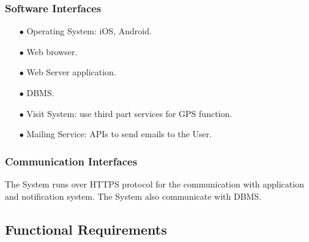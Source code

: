 \documentclass[a4paper, 12pt, oneside]{article}
\begin{document}
\subsubsection{Software Interfaces}
\begin{enumerate}
\item[$\bullet$] Operating System: iOS, Android.
\item[$\bullet$] Web browser.
\item[$\bullet$] Web Server application.
\item[$\bullet$] DBMS.
\item[$\bullet$] Visit System: use third part services for GPS function. 
\item[$\bullet$] Mailing Service: APIs to send emails to the User.
\end{enumerate}

\subsubsection{Communication Interfaces}
The System runs over HTTPS protocol for the communication with application and notification system. The System also communicate with DBMS.

\subsection{Functional Requirements}
\end{document}
